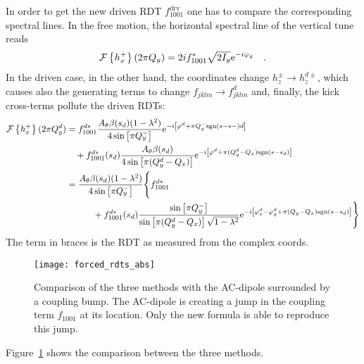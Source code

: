 %
In order to get the new driven RDT $f_{1001}^\text{drv}$ one has to compare the corresponding
spectral lines.
In the free motion, the horizontal spectral line of the vertical tune reads
%
\begin{equation}
    \mathcal{F} \left\{ h_x^+ \right\}(2\pi Q_y) = 2i f_{1001}^*\sqrt{2I_y}\text{e}^{-i\varphi_y}
    \quad .
\end{equation}
%
In the driven case, in the other hand, the coordinates change $h_z^\pm \rightarrow h_z^{d\pm}$, which
causes also the generating terms to change $f_{jklm} \rightarrow f^d_{jklm}$ and, finally, the kick
cross-terms pollute the driven RDTs:
%
\begin{align}
    \mathcal{F} \left\{ h_x^+ \right\}(2\pi Q_y^d)
    &=
        f^{d*}_{1001}
        \frac{A_\theta \beta(s_d)(1-\lambda^2)}{4 \sin\left[\pi Q_y^-\right]}
            \text{e}^{-i\left[ \varphi^d + \pi Q_y^-\text{sgn}(s-s-)d\right]}
        \notag \\ &\quad 
        + f^{d*}_{1001}(s_d)\frac{A_\theta\beta(s_d)}{4\sin\left[\pi(Q_y^d - Q_x)\right]} 
            \text{e}^{-i\left[ \varphi^d + \pi (Q_y^d-Q_x)\text{sgn}(s-s_d)\right]}
    \notag\\&=
        \frac{A_\theta \beta(s_d)(1-\lambda^2)}{4 \sin\left[\pi Q_y^-\right]}
        \Bigg\{
            f^{d*}_{1001}
            \notag \\ &\quad\quad\quad
            + f^{d*}_{1001} (s_d)
            \frac{\sin\left[\pi Q_y^-\right]}{\sin\left[\pi(Q_y^d - Q_x)\right] \sqrt{1-\lambda^2}} 
                \text{e}^{-i\left[ \varphi^d_x - \varphi^d_y + \pi (Q_y-Q_x)\text{sgn}(s-s_d)\right]}
        \Bigg\}
\end{align}
The term in braces is the RDT as measured from the complex coords.
%
\begin{figure}[h]
  \centering
  \texttt{[image: forced\_rdts\_abs]}
  \caption{Comparison of the three methods with the AC-dipole surrounded by a coupling bump.
    The AC-dipole is creating a jump in the coupling term $f_{1001}$ at its location. Only the new
    formula is able to reproduce this jump.
  }
  \label{fig_comp_felix_ryo}
\end{figure}
%
Figure~\ref{fig_comp_felix_ryo} shows the comparison between the three methods.

